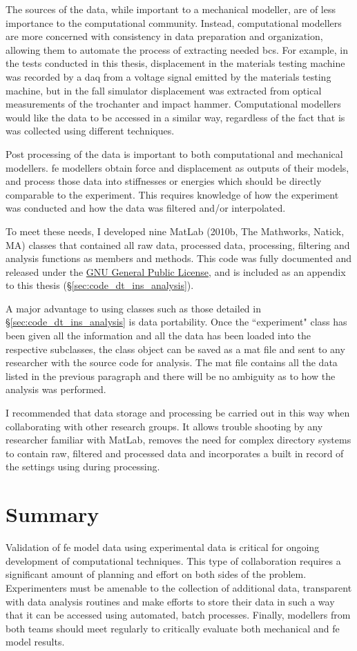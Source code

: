 The sources of the data, while important to a mechanical modeller, are of less importance to the computational community.
Instead, computational modellers are more concerned with consistency in data preparation and organization, allowing them to automate the process of extracting needed \acp{bc}.
For example, in the tests conducted in this thesis, displacement in the materials testing machine was recorded by a \ac{daq} from a voltage signal emitted by the materials testing machine, but in the fall simulator displacement was extracted from optical measurements of the trochanter and impact hammer.
Computational modellers would like the data to be accessed in a similar way, regardless of the fact that is was collected using different techniques.

Post processing of the data is important to both computational and mechanical modellers.
\ac{fe} modellers obtain force and displacement as outputs of their models, and process those data into stiffnesses or energies which should be directly comparable to the experiment.
This requires knowledge of how the experiment was conducted and how the data was filtered and/or interpolated.

To meet these needs, I developed nine MatLab (2010b, The Mathworks, Natick, MA) classes that contained all raw data, processed data, processing, filtering and analysis functions as members and methods.
This code was fully documented and released under the  \href{http://www.gnu.org/copyleft/gpl.html}{GNU General Public License}, and is included as an appendix to this thesis (\S\ref{sec:code_dt_ins_analysis}).

A major advantage to using classes such as those detailed in \S\ref{sec:code_dt_ins_analysis} is data portability.
Once the ``experiment" class has been given all the information and all the data has been loaded into the respective subclasses, the class object can be saved as a \ac{mat} file and sent to any researcher with the source code for analysis.
The \ac{mat} file contains all the data listed in the previous paragraph and there will be no ambiguity as to how the analysis was performed.

I recommended that data storage and processing be carried out in this way when collaborating with other research groups.
It allows trouble shooting by any researcher familiar with MatLab, removes the need for complex directory systems to contain raw, filtered and processed data and incorporates a built in record of the settings using during processing.

\section{Summary}
\label{sec:modelling_summary}
Validation of \ac{fe} model data using experimental data is critical for ongoing development of computational techniques.
This type of collaboration requires a significant amount of planning and effort on both sides of the problem.
Experimenters must be amenable to the collection of additional data, transparent with data analysis routines and make efforts to store their data in such a way that it can be accessed using automated, batch processes.
Finally, modellers from both teams should meet regularly to critically evaluate both mechanical and \ac{fe} model results.
